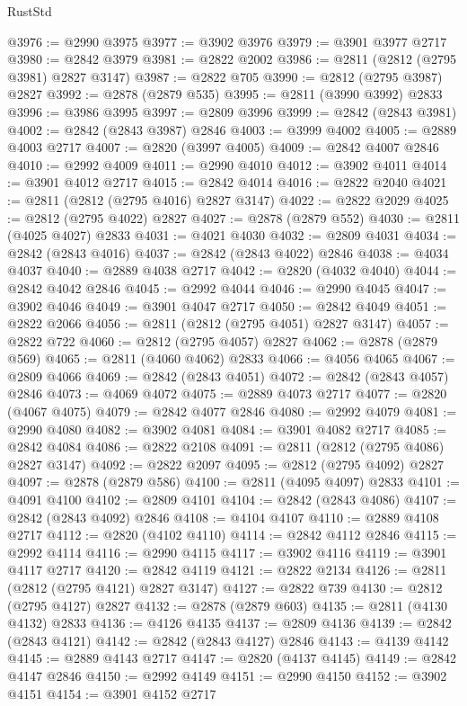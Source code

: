 \begin{lexlean}{RustStd}
\begin{coremodule}
@3976 := @2990 @3975
@3977 := @3902 @3976
@3979 := @3901 @3977 @2717
@3980 := @2842 @3979
@3981 := @2822 @2002
@3986 := @2811 (@2812 (@2795 @3981) @2827 @3147)
@3987 := @2822 @705
@3990 := @2812 (@2795 @3987) @2827
@3992 := @2878 (@2879 @535)
@3995 := @2811 (@3990 @3992) @2833
@3996 := @3986 @3995
@3997 := @2809 @3996
@3999 := @2842 (@2843 @3981)
@4002 := @2842 (@2843 @3987) @2846
@4003 := @3999 @4002
@4005 := @2889 @4003 @2717
@4007 := @2820 (@3997 @4005)
@4009 := @2842 @4007 @2846
@4010 := @2992 @4009
@4011 := @2990 @4010
@4012 := @3902 @4011
@4014 := @3901 @4012 @2717
@4015 := @2842 @4014
@4016 := @2822 @2040
@4021 := @2811 (@2812 (@2795 @4016) @2827 @3147)
@4022 := @2822 @2029
@4025 := @2812 (@2795 @4022) @2827
@4027 := @2878 (@2879 @552)
@4030 := @2811 (@4025 @4027) @2833
@4031 := @4021 @4030
@4032 := @2809 @4031
@4034 := @2842 (@2843 @4016)
@4037 := @2842 (@2843 @4022) @2846
@4038 := @4034 @4037
@4040 := @2889 @4038 @2717
@4042 := @2820 (@4032 @4040)
@4044 := @2842 @4042 @2846
@4045 := @2992 @4044
@4046 := @2990 @4045
@4047 := @3902 @4046
@4049 := @3901 @4047 @2717
@4050 := @2842 @4049
@4051 := @2822 @2066
@4056 := @2811 (@2812 (@2795 @4051) @2827 @3147)
@4057 := @2822 @722
@4060 := @2812 (@2795 @4057) @2827
@4062 := @2878 (@2879 @569)
@4065 := @2811 (@4060 @4062) @2833
@4066 := @4056 @4065
@4067 := @2809 @4066
@4069 := @2842 (@2843 @4051)
@4072 := @2842 (@2843 @4057) @2846
@4073 := @4069 @4072
@4075 := @2889 @4073 @2717
@4077 := @2820 (@4067 @4075)
@4079 := @2842 @4077 @2846
@4080 := @2992 @4079
@4081 := @2990 @4080
@4082 := @3902 @4081
@4084 := @3901 @4082 @2717
@4085 := @2842 @4084
@4086 := @2822 @2108
@4091 := @2811 (@2812 (@2795 @4086) @2827 @3147)
@4092 := @2822 @2097
@4095 := @2812 (@2795 @4092) @2827
@4097 := @2878 (@2879 @586)
@4100 := @2811 (@4095 @4097) @2833
@4101 := @4091 @4100
@4102 := @2809 @4101
@4104 := @2842 (@2843 @4086)
@4107 := @2842 (@2843 @4092) @2846
@4108 := @4104 @4107
@4110 := @2889 @4108 @2717
@4112 := @2820 (@4102 @4110)
@4114 := @2842 @4112 @2846
@4115 := @2992 @4114
@4116 := @2990 @4115
@4117 := @3902 @4116
@4119 := @3901 @4117 @2717
@4120 := @2842 @4119
@4121 := @2822 @2134
@4126 := @2811 (@2812 (@2795 @4121) @2827 @3147)
@4127 := @2822 @739
@4130 := @2812 (@2795 @4127) @2827
@4132 := @2878 (@2879 @603)
@4135 := @2811 (@4130 @4132) @2833
@4136 := @4126 @4135
@4137 := @2809 @4136
@4139 := @2842 (@2843 @4121)
@4142 := @2842 (@2843 @4127) @2846
@4143 := @4139 @4142
@4145 := @2889 @4143 @2717
@4147 := @2820 (@4137 @4145)
@4149 := @2842 @4147 @2846
@4150 := @2992 @4149
@4151 := @2990 @4150
@4152 := @3902 @4151
@4154 := @3901 @4152 @2717

\end{coremodule}
\end{lexlean}
